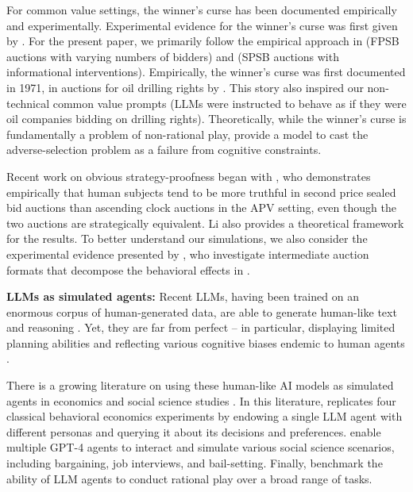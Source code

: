 \documentclass{article} %
\begin{document}
For common value settings, the winner's curse has been documented empirically and experimentally. 
Experimental evidence for the winner's curse was first given by \citet{bazerman1983won}. 
For the present paper, we primarily follow the empirical approach in \citet{kagel1986winner} (FPSB auctions with varying numbers of bidders) and \citet{kagel1987information} (SPSB auctions with informational interventions). 
Empirically, the winner's curse was first documented in 1971, in auctions for oil drilling rights by \cite{capen1971competitive}. 
This story also inspired our non-technical common value prompts (LLMs were instructed to behave as if they were oil companies bidding on drilling rights). 
Theoretically, while the winner's curse is fundamentally a problem of non-rational play,  \citet{charness2009origin} provide a model to cast the adverse-selection problem as a failure from cognitive constraints. 


Recent work on obvious strategy-proofness began with \citet{li2017obviously}, who demonstrates empirically that human subjects tend to be more truthful in second price sealed bid auctions than ascending clock auctions in the APV setting, even though the two auctions are strategically equivalent. 
Li also provides a theoretical framework for the results. 
To better understand our simulations, we also consider the experimental evidence presented by \citet{breitmoser2022obviousness}, who investigate intermediate auction formats that decompose the behavioral effects in \cite{li2017obviously}.

\textbf{LLMs as simulated agents:} Recent LLMs, having been trained on an enormous corpus of human-generated data, are able to generate human-like text and reasoning \cite{achiam2023gpt, bubeck2023sparks}. 
Yet, they are far from perfect -- in particular, displaying limited planning abilities and reflecting various cognitive biases endemic to human agents \cite{wan2023kelly}. 

There is a growing literature on using these human-like AI models as simulated agents in economics and social science studies \cite{aher2023using, park2023generative, brand2023using}. 
In this literature, \citet{horton2023large} replicates four classical behavioral economics experiments by endowing a single LLM agent with different personas and querying it about its decisions and preferences.
\citet{manning2024automated} enable multiple GPT-4 agents to interact and simulate various social science scenarios, including bargaining, job interviews, and bail-setting.
Finally, \cite{raman2024steerassessingeconomicrationality} benchmark the ability of LLM agents to conduct rational play over a broad range of tasks.
\end{document}
